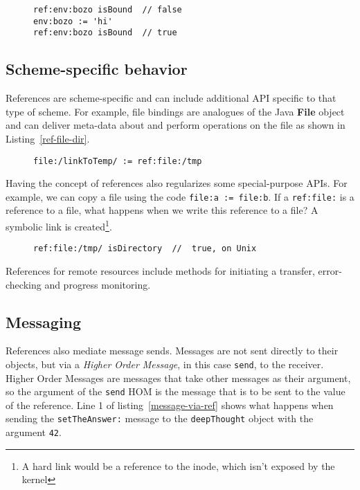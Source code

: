 \documentclass[preprint,authoryear]{acm_proc_article-sp}
\begin{document}
\begin{figure}[htbp]
\begin{lstlisting}[style=L,label=isBound,caption=Is environment variable set?]
ref:env:bozo isBound  // false
env:bozo := 'hi'
ref:env:bozo isBound  // true
\end{lstlisting}
\end{figure}

\subsection{Scheme-specific behavior}

References are scheme-specific and can include additional API specific to that type of scheme.
For example, file bindings are analogues of the Java {\bf File} object and can deliver
meta-data about and perform operations on the file as shown in Listing~\ref{ref-file-dir}.



\begin{figure}[htbp]
\begin{lstlisting}[style=L,label=symbolic-link,caption=Creating a symbolic link to {\tt /tmp}]
file:/linkToTemp/ := ref:file:/tmp
\end{lstlisting}
\end{figure}

Having the concept of references also regularizes some special-purpose APIs.  For example,
we can copy a file using the code {\tt file:a := file:b}.  If a {\tt ref:file:} is a reference to a file, what
happens when we write this reference to a file?  A symbolic link is created\footnote{A hard link
would be a reference to the inode, which isn't exposed by the kernel}.

\begin{figure}[htbp]
\begin{lstlisting}[style=L,label=ref-file-dir,caption=Is {\tt /tmp} a directory?]
ref:file:/tmp/ isDirectory  //  true, on Unix
\end{lstlisting}
\end{figure}

References for remote resources include methods for initiating a transfer,
error-checking and progress monitoring.  

\subsection{Messaging}

References also mediate message sends.   Messages are not sent directly to their objects, but via a
\emph{Higher Order Message}\cite{HOM}, in this case {\tt send}, to the receiver.    Higher Order Messages
are messages that take other messages as their argument, so the argument of the {\tt send} HOM is the
message that is to be sent to the value of the reference.   Line 1 of listing~\ref{message-via-ref} shows
what happens when sending the {\tt setTheAnswer:} message to the {\tt deepThought} object with
the argument {\tt 42}.
\end{document}
